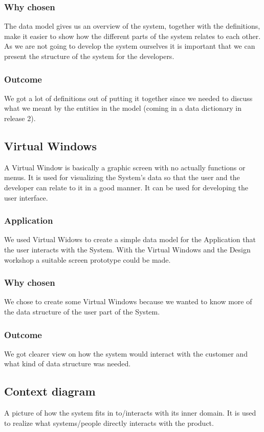 \documentclass[a4paper]{article}
\begin{document}
		\subsubsection{Why chosen}
		The data model gives us an overview of the system, together with the definitions, make it easier to show how the different parts of the system relates to each other. As we are not going to develop the system ourselves it is important that we can present the structure of the system for the developers. 
		\subsubsection{Outcome}
	We got a lot of definitions out of putting it together since we needed to discuss what we meant by the entities in the model (coming in a data dictionary in release 2).

		\subsection{Virtual Windows}
			A Virtual Window is basically a graphic screen with no actually functions or menus. It is used for visualizing the System's data so that the user and the developer can relate to it in a good manner. It can be used for developing the user interface.
			\subsubsection{Application}
				We used Virtual Widows to create a simple data model for the Application that the user interacts with the System. With the Virtual Windows and the Design workshop a suitable screen prototype could be made.
			\subsubsection{Why chosen}
				We chose to create some Virtual Windows because we wanted to know more of the data structure of the user part of the System.
			\subsubsection{Outcome}
				We got clearer view on how the system would interact with the customer and what kind of data structure was needed.
		\subsection{Context diagram} \label{subsec:context}
		A picture of how the system fits in to/interacts with its inner domain. It is used to realize what systems/people directly interacts with the product.
\end{document}
